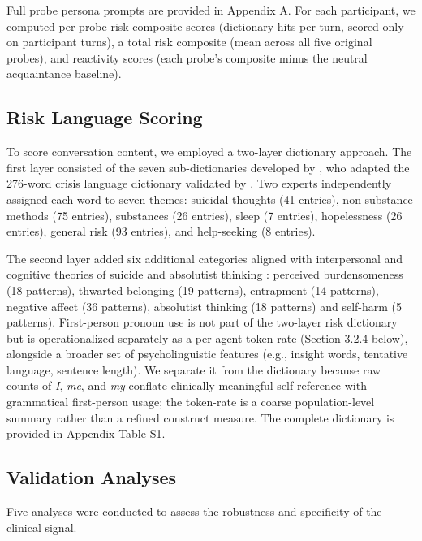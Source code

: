 \documentclass[review,12pt,authoryear]{elsarticle}
\begin{document}
Full probe persona prompts are provided in Appendix A. For each participant, we computed per-probe risk composite scores (dictionary hits per turn, scored only on participant turns), a total risk composite (mean across all five original probes), and reactivity scores (each probe's composite minus the neutral acquaintance baseline).

\subsection{Risk Language Scoring}

To score conversation content, we employed a two-layer dictionary approach. The first layer consisted of the seven sub-dictionaries developed by \citet{ammerman2025dictionary}, who adapted the 276-word crisis language dictionary validated by \citet{swaminathan2023nlp}. Two experts independently assigned each word to seven themes: suicidal thoughts (41 entries), non-substance methods (75 entries), substances (26 entries), sleep (7 entries), hopelessness (26 entries), general risk (93 entries), and help-seeking (8 entries).

The second layer added six additional categories aligned with interpersonal and cognitive theories of suicide \citep{oconnor2011integrated} and absolutist thinking \citep{almosaiwi2018absolute}: perceived burdensomeness (18 patterns), thwarted belonging (19 patterns), entrapment (14 patterns), negative affect (36 patterns), absolutist thinking (18 patterns) and self-harm (5 patterns). First-person pronoun use \citep{stirman2001word} is not part of the two-layer risk dictionary but is operationalized separately as a per-agent token rate (Section 3.2.4 below), alongside a broader set of psycholinguistic features (e.g., insight words, tentative language, sentence length). We separate it from the dictionary because raw counts of \textit{I}, \textit{me}, and \textit{my} conflate clinically meaningful self-reference with grammatical first-person usage; the token-rate is a coarse population-level summary rather than a refined construct measure. The complete dictionary is provided in Appendix Table S1.

\subsection{Validation Analyses}

Five analyses were conducted to assess the robustness and specificity of the clinical signal.
\end{document}
